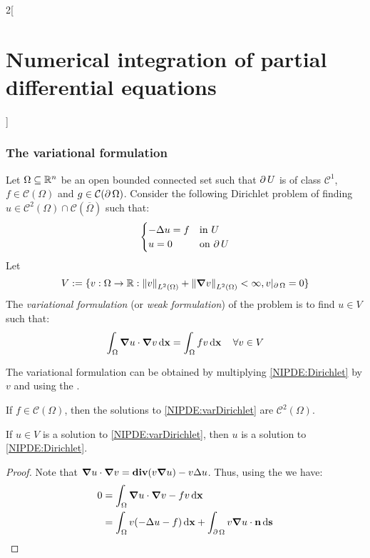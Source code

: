 \documentclass[../../../main_math.tex]{subfiles}
\begin{document}
\begin{multicols}{2}[\section{Numerical integration of partial differential equations}]
  \subsubsection{The variational formulation}
  \begin{definition}
    Let $\Omega\subseteq \mathbb{R}^n$ be an open bounded connected set such that $\operatorname{\partial}{U}$ is of class $\mathcal{C}^1$, $f\in\mathcal{C}(\Omega)$ and $g\in\mathcal{C}(\operatorname{\partial}{\Omega})$. Consider the following Dirichlet problem of finding $u\in\mathcal{C}^2(\Omega)\cap \mathcal{C}(\overline{\Omega})$ such that:
    \begin{equation}\label{NIPDE:Dirichlet}
      \begin{cases}
        -\Delta{u} = f & \text{in $U$}      \\
        u=0                & \text{on $\operatorname{\partial}{U}$}
      \end{cases}
    \end{equation}
    Let
    $$V:=\{v:\Omega\rightarrow\mathbb{R}:\left\|v\right\|_{L^2(\Omega)}+\left\|\grad{v}\right\|_{L^2(\Omega)}<\infty, v|_{\operatorname{\partial}{\Omega}}=0\}$$
    The \emph{variational formulation} (or \emph{weak formulation}) of the problem is to find $u\in V$ such that:
    \begin{equation}\label{NIPDE:varDirichlet}
      \int_\Omega \grad{u}\cdot\grad{v}\dd{\boldsymbol{\mathrm{x}}}=\int_\Omega fv\dd{\boldsymbol{\mathrm{x}}}\quad\forall v\in V
    \end{equation}
  \end{definition}
  \begin{remark}
    The variational formulation can be obtained by multiplying \cref{NIPDE:Dirichlet} by $v$ and using the .
  \end{remark}
  \begin{theorem}
    If $f\in \mathcal{C}(\Omega)$, then the solutions to \cref{NIPDE:varDirichlet} are $\mathcal{C}^2(\Omega)$.
  \end{theorem}
  \begin{lemma}
    If $u\in V$ is a solution to \cref{NIPDE:varDirichlet}, then $u$ is a solution to \cref{NIPDE:Dirichlet}.
  \end{lemma}
  \begin{proof}
    Note that $\grad u\cdot\grad v=\operatorname{\boldsymbol{\mathrm{div}}}(v\grad u) - v\Delta u$. Thus, using the  we have:
    \begin{align*}
      0 & =\int_\Omega \grad{u}\cdot\grad{v}-fv\dd{\vf{x}}                                             \\
        & =\int_\Omega v(-\laplacian u-f)\dd{\vf{x}}+\int_{\Fr{\Omega}}v\grad{u}\cdot\vf{n}\dd{\vf{s}} \\

\end{align*}
\end{proof}
\end{multicols}
\end{document}
